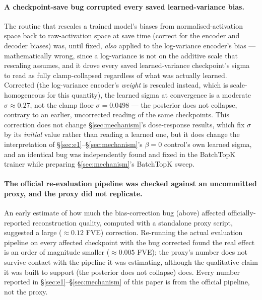 \documentclass[11pt]{article}
\begin{document}
\paragraph{A checkpoint-save bug corrupted every saved learned-variance
bias.} The routine that rescales a trained model's biases from
normalised-activation space back to raw-activation space at save time
(correct for the encoder and decoder biases) was, until fixed, \emph{also}
applied to the log-variance encoder's bias --- mathematically wrong, since a
log-variance is not on the additive scale that rescaling assumes, and it
drove every saved learned-variance checkpoint's sigma to read as fully
clamp-collapsed regardless of what was actually learned. Corrected (the
log-variance encoder's \emph{weight} is rescaled instead, which is
scale-homogeneous for this quantity), the learned sigma at convergence is a
moderate $\sigma\approx0.27$, not the clamp floor $\sigma=0.0498$ --- the
posterior does not collapse, contrary to an earlier, uncorrected reading of
the same checkpoints. This correction does not change \S\ref{sec:mechanism}'s
dose-response results, which fix $\sigma$ by its \emph{initial} value rather
than reading a learned one, but it does change the interpretation of
\S\ref{sec:e1}--\S\ref{sec:mechanism}'s $\beta=0$ control's own learned
sigma, and an identical bug was independently found and fixed in the
BatchTopK trainer while preparing \S\ref{sec:mechanism}'s BatchTopK sweep.

\paragraph{The official re-evaluation pipeline was checked against an
uncommitted proxy, and the proxy did not replicate.} An early estimate of
how much the bias-correction bug (above) affected officially-reported
reconstruction quality, computed with a standalone proxy script, suggested a
large ($\approx0.12$ FVE) correction. Re-running the actual evaluation
pipeline on every affected checkpoint with the bug corrected found the real
effect is an order of magnitude smaller ($\approx0.005$ FVE); the proxy's
number does not survive contact with the pipeline it was estimating,
although the qualitative claim it was built to support (the posterior does
not collapse) does. Every number reported in \S\ref{sec:e1}--\S\ref{sec:mechanism}
of this paper is from the official pipeline, not the proxy.
\end{document}
